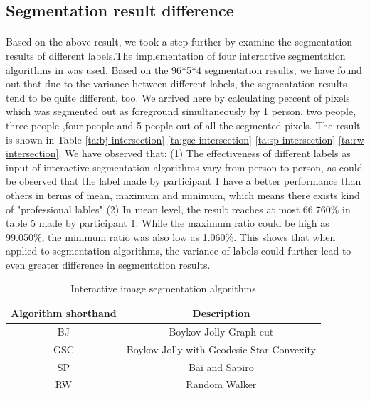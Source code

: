 \documentclass[runningheads,a4paper]{llncs}
\begin{document}
\subsection{Segmentation result difference}
\paragraph{}Based on the above result, we took a step further by examine the segmentation results of different labels.The implementation of four interactive segmentation algorithms in \citep{gulshan2010geodesic} was used. Based on the 96*5*4 segmentation results, we have found out that due to the variance between different labels, the segmentation results tend to be quite different, too.  We arrived here by calculating percent of pixels which was segmented out as foreground simultaneously by 1 person, two people, three people ,four people and 5 people out of all the segmented pixels. The result is shown in Table \ref{ta:bj intersection} \ref{ta:gsc intersection} \ref{ta:sp intersection} \ref{ta:rw intersection}. We have observed that: (1) The effectiveness of different labels as input of interactive segmentation algorithms vary from person to person, as could be observed that the label made by participant 1 have a better performance than others in terms of mean, maximum and minimum, which means there exists kind of "professional lables" \citep{fu2008saliency} (2) In mean level, the result reaches at most 66.760\% in table 5 made by participant 1. While the maximum ratio could be high as 99.050\%, the minimum ratio was also low as 1.060\%. This shows that when applied to segmentation algorithms, the variance of labels could further lead to even greater difference in segmentation results.

\begin{table}
\centering
\begin{tabular}{|c|c|}
\hline
Algorithm shorthand & Description\\
\hline
BJ\citep{boykov2001interactive} &  Boykov Jolly Graph cut  \\
\hline
GSC\citep{gulshan2010geodesic}& Boykov Jolly with Geodesic Star-Convexity \\
\hline
SP\citep{bai2007geodesic} & Bai and Sapiro \\
\hline
RW\citep {grady2006random}& Random Walker  \\
\hline
\end{tabular}
\caption{Interactive image segmentation algorithms}
\label{ta:algorithms}
\end{table}
\end{document}
